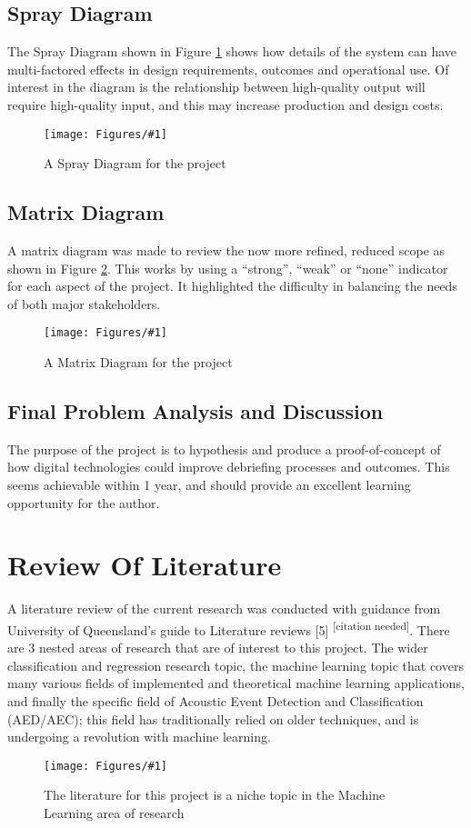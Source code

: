 \documentclass{UoNMCHA}
\newcommand{\citationneeded}{\textsuperscript{\color{blue} [citation needed]}}
\newcommand{\fref}[1] {Figure \ref{#1}}
\newcommand{\fFigure}[3]{
	\begin{figure}[h]
        \begin{center}  
            \texttt{[image: Figures/\#1]}  
            \caption{#2}
            \label{#1}
        \end{center}
	\end{figure}
}
\numberwithin{equation}{section}
\begin{document}
\subsection{Spray Diagram}
The Spray Diagram shown in \fref{SprayDiagram.png} shows how details of the system can have multi-factored effects in design requirements, outcomes and operational use. Of interest in the diagram is the relationship between high-quality output will require high-quality input, and this may increase production and design costs. 
\fFigure{SprayDiagram.png}{A Spray Diagram for the project}{1}

\subsection{Matrix Diagram}
A matrix diagram was made to review the now more refined, reduced scope as shown in \fref{MatrixDiagram.png}. This works by using a “strong”, “weak” or “none” indicator for each aspect of the project. It highlighted the difficulty in balancing the needs of both major stakeholders. 
\fFigure{MatrixDiagram.png}{A Matrix Diagram for the project}{0.8}

\subsection{Final Problem Analysis and Discussion}
The purpose of the project is to hypothesis and produce a proof-of-concept of how digital technologies could improve debriefing processes and outcomes. This seems achievable within 1 year, and should provide an excellent learning opportunity for the author.

\section{Review Of Literature}
A literature review of the current research was conducted with guidance from University of Queensland’s guide to Literature reviews [5] \citationneeded . There are 3 nested areas of research that are of interest to this project. The wider classification and regression research topic, the machine learning topic that covers many various fields of implemented and theoretical machine learning applications, and finally the specific field of Acoustic Event Detection and Classification (AED/AEC); this field has traditionally relied on older techniques, and is undergoing a revolution with machine learning. 
\fFigure{niche.png}{The literature for this project is a niche topic in the Machine Learning area of research}{0.8}
\end{document}
